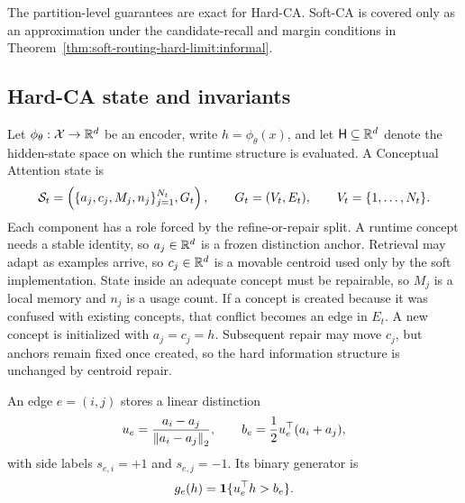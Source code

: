 The partition-level guarantees are exact for Hard-CA. Soft-CA is covered only as an approximation under the candidate-recall and margin conditions in Theorem~\ref{thm:soft-routing-hard-limit:informal}.

\subsection{Hard-CA state and invariants}

\begin{definition}
\label{def:hard-dgm-state}
Let $\phi_\theta:\mathcal{X}\to\mathbb{R}^d$ be an encoder, write $h=\phi_\theta(x)$, and let $\mathsf H\subseteq\mathbb{R}^d$ denote the hidden-state space on which the runtime structure is evaluated. A Conceptual Attention state is
\begin{align*}
\mathcal{S}_t=\left(\{a_j,c_j,M_j,n_j\}_{j=1}^{N_t},G_t\right),
\qquad
G_t=(V_t,E_t),\qquad V_t=\{1,\ldots,N_t\}.
\end{align*}
Each component has a role forced by the refine-or-repair split. A runtime concept needs a stable identity, so $a_j\in\mathbb{R}^d$ is a frozen distinction anchor. Retrieval may adapt as examples arrive, so $c_j\in\mathbb{R}^d$ is a movable centroid used only by the soft implementation. State inside an adequate concept must be repairable, so $M_j$ is a local memory and $n_j$ is a usage count. If a concept is created because it was confused with existing concepts, that conflict becomes an edge in $E_t$. A new concept is initialized with $a_j=c_j=h$. Subsequent repair may move $c_j$, but anchors remain fixed once created, so the hard information structure is unchanged by centroid repair.

An edge $e=(i,j)$ stores a linear distinction
\begin{align*}
u_e=\frac{a_i-a_j}{\left\lVert a_i-a_j\right\rVert_2},\qquad b_e=\frac{1}{2}u_e^\top(a_i+a_j),
\end{align*}
with side labels $s_{e,i}=+1$ and $s_{e,j}=-1$. Its binary generator is
\begin{align*}
g_e(h)=\mathbf{1}\{u_e^\top h>b_e\}.
\end{align*}
\end{definition}

